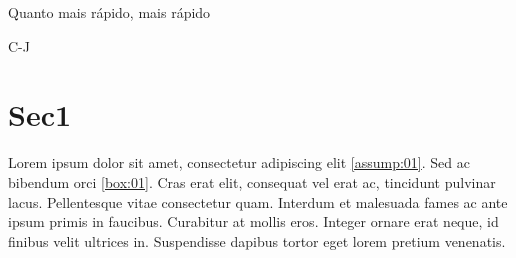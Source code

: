 \documentclass[11pt, a4paper]{report}
\begin{document}
\epigraph{Quanto mais rápido, mais rápido}{C-J}

\section{Sec1} \label{chp2:sec1}

\par Lorem ipsum dolor sit amet, consectetur adipiscing elit \ref{assump:01}. Sed ac bibendum orci \ref{box:01}. Cras erat elit, consequat vel erat ac, tincidunt pulvinar lacus. Pellentesque vitae consectetur quam. Interdum et malesuada fames ac ante ipsum primis in faucibus. Curabitur at mollis eros. Integer ornare erat neque, id finibus velit ultrices in. Suspendisse dapibus tortor eget lorem pretium venenatis. 
\end{document}

